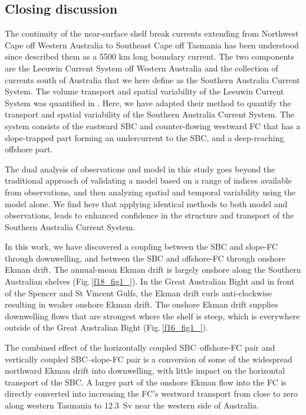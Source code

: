 \documentclass[preprint,3p,review,12pt]{elsarticle}
\begin{document}
\subsection{Closing discussion}\label{Closing discussion}
The continuity of the near-surface shelf break currents extending from Northwest Cape off Western Australia to Southeast Cape off Tasmania has been understood since \citet{Ridgway2004} described them as a 5500 km long boundary current. The two components are the Leeuwin Current System off Western Australia and the collection of currents south of Australia that we here define as the Southern Australia Current System. The volume transport and spatial variability of the Leeuwin Current System was quantified in \citet{Furue2017}. Here, we have adapted their method to quantify the transport and spatial variability of the Southern Australia Current System. The system consists of the eastward SBC and counter-flowing westward FC that has a slope-trapped part forming an undercurrent to the SBC, and a deep-reaching offshore part. 

The dual analysis of observations and model in this study goes beyond the traditional approach of validating a model based on a range of indices available from observations, and then analyzing spatial and temporal variability using the model alone. We find here that applying identical methods to both model and observations, leads to enhanced confidence in the structure and transport of the Southern Australia Current System.

In this work, we have discovered a coupling between the SBC and slope-FC through downwelling, and between the SBC and offshore-FC through onshore Ekman drift. The annual-mean Ekman drift is largely onshore along the Southern Australian shelves (Fig.\,\ref{f18_fig1_}). In the Great Australian Bight and in front of the Spencer and St Vincent Gulfs, the Ekman drift curls anti-clockwise resulting in weaker onshore Ekman drift. The onshore Ekman drift supplies downwelling flows that are strongest where the shelf is steep, which is everywhere outside of the Great Australian Bight (Fig.\,\ref{f16_fig1_}).

The combined effect of the horizontally coupled SBC--offshore-FC pair and vertically coupled SBC--slope-FC pair is a conversion of some of the widespread northward Ekman drift into downwelling, with little impact on the horizontal transport of the SBC\@. A larger part of the onshore Ekman flow into the FC is directly converted into increasing the FC's westward transport from close to zero along western Tasmania to \SI{12.3}{Sv} near the western side of Australia. 
\end{document}
